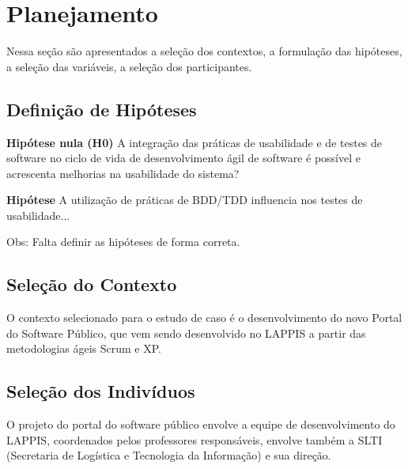 

\section{Planejamento}

Nessa seção são apresentados a seleção dos contextos, a formulação das hipóteses, a seleção das variáveis, a seleção dos participantes.

\subsection{Definição de Hipóteses}

\textbf{Hipótese nula (H0)} A integração das práticas de usabilidade e de testes de software no ciclo de vida de desenvolvimento ágil de software é possível e acrescenta melhorias na usabilidade do sistema?

\textbf{Hipótese} A utilização de práticas de BDD/TDD influencia nos testes de usabilidade...

Obs: Falta definir as hipóteses de forma correta.

\subsection{Seleção do Contexto}

O contexto selecionado para o estudo de caso é o desenvolvimento do novo Portal do Software Público, que vem sendo desenvolvido no LAPPIS a partir das metodologias ágeis Scrum e XP.		


\subsection{Seleção dos Indivíduos}

O projeto do portal do software público envolve a equipe de desenvolvimento do LAPPIS, coordenados pelos professores responsáveis, envolve também a SLTI (Secretaria de Logística e Tecnologia da Informação) e sua direção.

